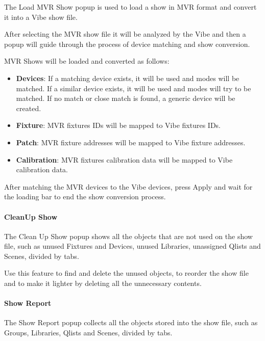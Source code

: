 \documentclass[
]{article}
\providecommand{\tightlist}{%
  \setlength{\itemsep}{0pt}\setlength{\parskip}{0pt}}
\begin{document}
The Load MVR Show popup is used to load a show in MVR format and convert it into a Vibe show file.

After selecting the MVR show file it will be analyzed by the Vibe and then a popup will guide through the process of device matching and show conversion.

MVR Shows will be loaded and converted as follows:

\begin{itemize}
\tightlist
\item
  \textbf{Devices}: If a matching device exists, it will be used and modes will be matched. If a similar device exists, it will be used and modes will try to be matched. If no match or close match is found, a generic device will be created.
\end{itemize}

\begin{itemize}
\item
  \textbf{Fixture}: MVR fixtures IDs will be mapped to Vibe fixtures IDs.
\item
  \textbf{Patch}: MVR fixture addresses will be mapped to Vibe fixture addresses.
\item
  \textbf{Calibration}: MVR fixtures calibration data will be mapped to Vibe calibration data.
\end{itemize}

After matching the MVR devices to the Vibe devices, press Apply and wait for the loading bar to end the show conversion process.

\hypertarget{cleanup-show}{%
\paragraph{CleanUp Show}\label{cleanup-show}}

The Clean Up Show popup shows all the objects that are not used on the show file, such as unused Fixtures and Devices, unused Libraries, unassigned Qlists and Scenes, divided by tabs.

Use this feature to find and delete the unused objects, to reorder the show file and to make it lighter by deleting all the unnecessary contents.

\hypertarget{show-report}{%
\paragraph{Show Report}\label{show-report}}

The Show Report popup collects all the objects stored into the show file, such as Groups, Libraries, Qlists and Scenes, divided by tabs.
\end{document}
